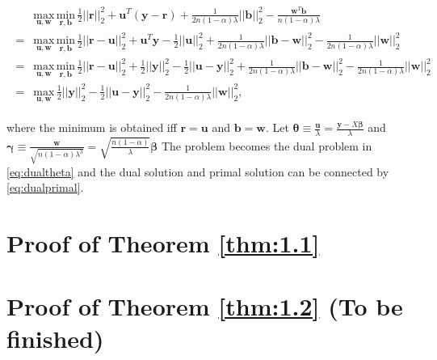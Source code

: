 \begin{gather}
    \label{eq:dualuw}
    \begin{aligned}
        &\underset{\boldsymbol u,\boldsymbol w}{\mathrm{max}}\,\underset{\boldsymbol r,\boldsymbol b}{\mathrm{min}}\,\frac{1}{2}||\boldsymbol r||_2^2+\boldsymbol u^T(\boldsymbol y-\boldsymbol r)+\frac{1}{2n(1-\alpha)\lambda}||\boldsymbol b||_2^2-\frac{\boldsymbol w^T\boldsymbol b}{n(1-\alpha)\lambda}\\
        =&\underset{\boldsymbol u,\boldsymbol w}{\mathrm{max}}\,\underset{\boldsymbol r,\boldsymbol b}{\mathrm{min}}\,\frac{1}{2}||\boldsymbol r-\boldsymbol u||_2^2+\boldsymbol u^T\boldsymbol y-\frac{1}{2}||\boldsymbol u||_2^2+\frac{1}{2n(1-\alpha)\lambda}||\boldsymbol b-\boldsymbol w||_2^2-\frac{1}{2n(1-\alpha)\lambda}||\boldsymbol w||_2^2\\
        =&\underset{\boldsymbol u,\boldsymbol w}{\mathrm{max}}\,\underset{\boldsymbol r,\boldsymbol b}{\mathrm{min}}\,\frac{1}{2}||\boldsymbol r-\boldsymbol u||_2^2+\frac{1}{2}||\boldsymbol y||_2^2-\frac{1}{2}||\boldsymbol u-\boldsymbol y||_2^2+\frac{1}{2n(1-\alpha)\lambda}||\boldsymbol b-\boldsymbol w||_2^2-\frac{1}{2n(1-\alpha)\lambda}||\boldsymbol w||_2^2\\
        =&\underset{\boldsymbol u,\boldsymbol w}{\mathrm{max}}\,\frac{1}{2}||\boldsymbol y||_2^2-\frac{1}{2}||\boldsymbol u-\boldsymbol y||_2^2-\frac{1}{2n(1-\alpha)\lambda}||\boldsymbol w||_2^2,
    \end{aligned}
\end{gather}

where the minimum is obtained iff $\boldsymbol r=\boldsymbol u$ and $\boldsymbol b=\boldsymbol w$. Let $\boldsymbol\theta\equiv\frac{\boldsymbol u}{\lambda}=\frac{\boldsymbol y-X\boldsymbol\beta}{\lambda}$ and $\boldsymbol\gamma\equiv\frac{\boldsymbol w}{\sqrt{n(1-\alpha)\lambda^3}}=\sqrt{\frac{n(1-\alpha)}{\lambda}}\boldsymbol\beta$ The problem becomes the dual problem in \eqref{eq:dualtheta} and the dual solution and primal solution can be connected by \eqref{eq:dualprimal}.

\section{Proof of Theorem \ref{thm:1.1}}

\section{Proof of Theorem \ref{thm:1.2} (To be finished)}

